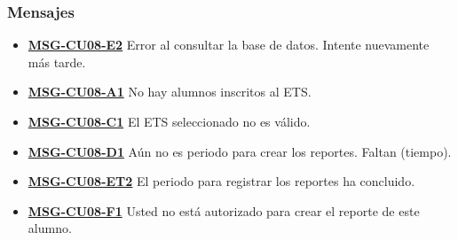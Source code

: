 \subsubsection{Mensajes}
\begin{itemize}
	\item \textbf{\hyperref[msg:CU08-E2]{MSG-CU08-E2}} Error al consultar la base de datos. Intente nuevamente más tarde.
	\item \textbf{\hyperref[msg:CU08-A1]{MSG-CU08-A1}} No hay alumnos inscritos al ETS.
	\item \textbf{\hyperref[msg:CU08-C1]{MSG-CU08-C1}} El ETS seleccionado no es válido.
	\item \textbf{\hyperref[msg:CU08-D1]{MSG-CU08-D1}} Aún no es periodo para crear los reportes. Faltan (tiempo).
	\item \textbf{\hyperref[msg:CU08-ET2]{MSG-CU08-ET2}} El periodo para registrar los reportes ha concluido.
	\item \textbf{\hyperref[msg:CU08-F1]{MSG-CU08-F1}} Usted no está autorizado para crear el reporte de este alumno.
\end{itemize}